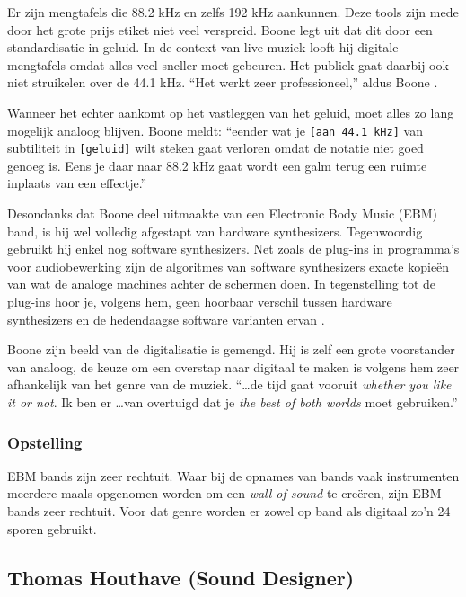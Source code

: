 Er zijn mengtafels die 88.2 kHz en zelfs 192 kHz aankunnen. Deze tools zijn mede door het grote prijs etiket niet veel verspreid. Boone legt uit dat dit door een standardisatie in geluid. In de context van live muziek looft hij digitale mengtafels omdat alles veel sneller moet gebeuren. Het publiek gaat daarbij ook niet struikelen over de 44.1 kHz. ``Het werkt zeer professioneel,'' aldus Boone \autocite{peterboone}.

Wanneer het echter aankomt op het vastleggen van het geluid, moet alles zo lang mogelijk analoog blijven. Boone meldt: ``eender wat je \verb+[aan 44.1 kHz]+ van subtiliteit in \verb+[geluid]+ wilt steken gaat verloren omdat de notatie niet goed genoeg is. Eens je daar naar 88.2 kHz gaat wordt een galm terug een ruimte inplaats van een effectje.'' \autocite{peterboone}

Desondanks dat Boone deel uitmaakte van een Electronic Body Music (EBM) band, is hij wel volledig afgestapt van hardware synthesizers. Tegenwoordig gebruikt hij enkel nog software synthesizers. Net zoals de plug-ins in programma's voor audiobewerking zijn de algoritmes van software synthesizers exacte kopieën van wat de analoge machines achter de schermen doen. In tegenstelling tot de plug-ins hoor je, volgens hem, geen hoorbaar verschil tussen hardware synthesizers en de hedendaagse software varianten ervan \autocite{peterboone}.

Boone zijn beeld van de digitalisatie is gemengd. Hij is zelf een grote voorstander van analoog, de keuze om een overstap naar digitaal te maken is volgens hem zeer afhankelijk van het genre van de muziek.  ``\ldots de tijd gaat vooruit \textit{whether you like it or not}. Ik ben er \ldots van overtuigd dat je \textit{the best of both worlds} moet gebruiken.'' \autocite{peterboone}

\subsubsection*{Opstelling}

EBM bands zijn zeer rechtuit. Waar bij de opnames van bands vaak instrumenten meerdere maals opgenomen worden om een \textit{wall of sound} te creëren, zijn EBM bands zeer rechtuit. Voor dat genre worden er zowel op band als digitaal zo'n 24 sporen gebruikt.

\subsection{Thomas Houthave (Sound Designer)}

